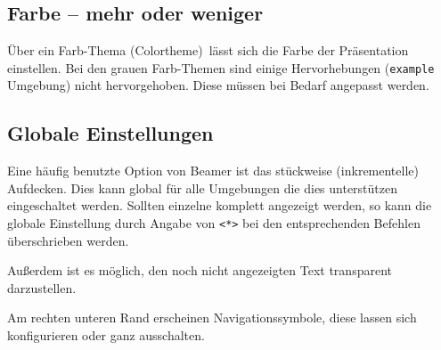 \subsection{Farbe -- mehr oder weniger}

Über ein Farb-Thema (Colortheme) lässt sich die Farbe der Präsentation
einstellen.  Bei den grauen Farb-Themen sind einige Hervorhebungen
(\texttt{example} Umgebung) nicht hervorgehoben.  Diese müssen bei Bedarf
angepasst werden.

\begin{lfgwcode}{}
}
\end{lfgwcode}

\subsection{Globale Einstellungen}

Eine häufig benutzte Option von Beamer ist das stückweise (inkrementelle)
Aufdecken.  Dies kann global für alle Umgebungen die dies unterstützen
eingeschaltet werden. Sollten einzelne komplett angezeigt werden, so kann
die globale Einstellung durch Angabe von \texttt{<*>} bei den entsprechenden
Befehlen überschrieben werden.

Außerdem ist es möglich, den noch nicht angezeigten
Text transparent darzustellen.

Am rechten unteren Rand erscheinen Navigationssymbole, diese lassen sich
konfigurieren oder ganz ausschalten.

\begin{lfgwcode}{}
{
  \beamerdefaultoverlayspecification{<+->}
}
\end{lfgwcode}

